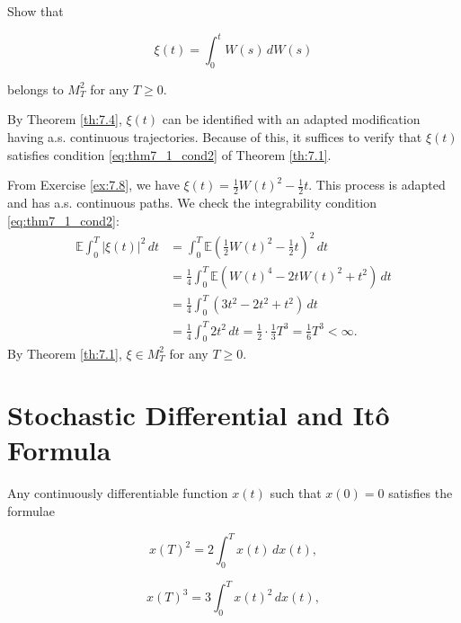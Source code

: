\begin{Exercise}
\label{ex:7.11}
Show that

\begin{equation}
\xi(t) = \int_0^t W(s) \, dW(s)
\end{equation}

belongs to $M_T^2$ for any $T \geq 0$.

\begin{hint}
By Theorem \ref{th:7.4}, $\xi(t)$ can be identified with an adapted modification having a.s. continuous trajectories. Because of this, it suffices to verify that $\xi(t)$ satisfies condition \eqref{eq:thm7_1_cond2} of Theorem \ref{th:7.1}.
\end{hint}
\end{Exercise}

\begin{Solution}
From Exercise \ref{ex:7.8}, we have $\xi(t) = \frac{1}{2} W(t)^2 - \frac{1}{2} t$. This process is adapted and has a.s. continuous paths. We check the integrability condition \eqref{eq:thm7_1_cond2}:
\begin{align*}
\mathbb{E} \int_0^T |\xi(t)|^2 \, dt &= \int_0^T \mathbb{E} \left( \frac{1}{2} W(t)^2 - \frac{1}{2} t \right)^2 \, dt \\
&= \frac{1}{4} \int_0^T \mathbb{E} (W(t)^4 - 2 t W(t)^2 + t^2) \, dt \\
&= \frac{1}{4} \int_0^T (3t^2 - 2t^2 + t^2) \, dt \\
&= \frac{1}{4} \int_0^T 2t^2 \, dt = \frac{1}{2} \cdot \frac{1}{3} T^3 = \frac{1}{6} T^3 < \infty.
\end{align*}
By Theorem \ref{th:7.1}, $\xi \in M_T^2$ for any $T \geq 0$.
\end{Solution}

\section{Stochastic Differential and Itô Formula}
\label{sec:ItoFormula}

Any continuously differentiable function $x(t)$ such that $x(0) = 0$ satisfies the formulae

\begin{equation}
x(T)^2 = 2 \int_0^T x(t) \, dx(t),
\end{equation}

\begin{equation}
x(T)^3 = 3 \int_0^T x(t)^2 \, dx(t),
\end{equation}

